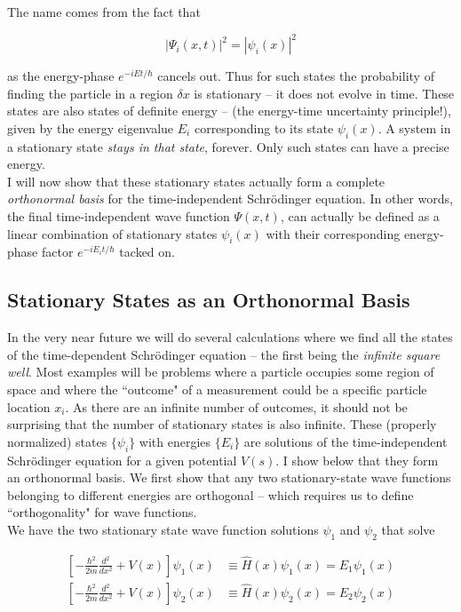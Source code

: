 The name comes from the fact that 

\[
|\Psi_i(x, t)|^2 = |\psi_i(x)|^2
\] \vspace{3px}

as the energy-phase $e^{-iEt/\hbar}$ cancels out. Thus for such states the
probability of finding the particle in a region $\delta x$ is stationary -- it
does not evolve in time. These states are also states of definite energy --
(the energy-time uncertainty principle!), given by the energy eigenvalue $E_i$
corresponding to its state $\psi_i(x)$. A system in a stationary state
\textit{stays in that state}, forever. Only such states can have a precise
energy. \\


I will now show that these stationary states actually form a complete
\textit{orthonormal basis} for the time-independent Schr\"odinger equation. In
other words, the final time-independent wave function  $\Psi(x, t)$, can actually be
defined as a linear combination of stationary states $\psi_i(x)$ with their
corresponding energy-phase factor $e^{-iE_i t/\hbar}$ tacked on. 

\subsection{Stationary States as an Orthonormal Basis}

In the very near future we will do several calculations where we find all the
states of the time-dependent Schr\"odinger equation -- the first being the
\textit{infinite square well}. Most examples will be problems where a particle
occupies some region of space and where the ``outcome" of a measurement could
be a specific particle location $x_i$. As there are an infinite number of
outcomes, it should not be surprising that the number of stationary states is
also infinite. These (properly normalized) states $\{\psi_i\}$ with energies
$\{ E_i \}$ are solutions of the time-independent Schr\"odinger equation for
a given potential $V(s)$. I show below that they form an orthonormal basis. We
first show that any two stationary-state wave functions belonging to different
energies are orthogonal -- which requires us to define ``orthogonality" for
wave functions. \\

We have the two stationary state wave function solutions $\psi_1$ and $\psi_2$
that solve 

\begin{align} 
  \left[ -\frac{\hbar^2}{2m} \frac{d^2 }{d x^2} + V(x) \right] \psi_1(x) &\equiv
  \hat{H}(x)\psi_1(x) = E_1\psi_1(x) \label{eq_1} \\ \left[ -\frac{\hbar^2}{2m} \frac{d^2
}{d x^2} + V(x)\right] \psi_2(x) &\equiv \hat{H}(x) \psi_2(x) = E_2\psi_2(x)
\label{eq_2}
\end{align} \vspace{3px}

